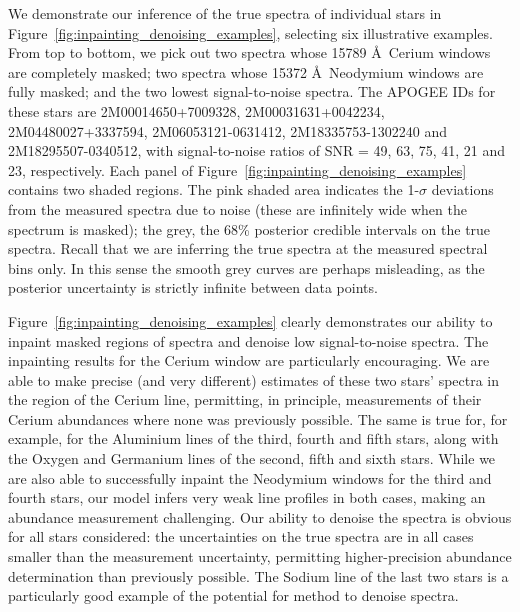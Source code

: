\documentclass[a4paper,fleqn,usenatbib]{mnras}
\begin{document}
We demonstrate our inference of the true spectra of individual stars in Figure~\ref{fig:inpainting_denoising_examples}, selecting six illustrative examples. From top to bottom, we pick out two spectra whose 15789 \AA\ Cerium windows are completely masked; two spectra whose 15372 \AA\ Neodymium windows are fully masked; and the two lowest signal-to-noise spectra. The APOGEE IDs for these stars are 2M00014650+7009328, 2M00031631+0042234, 2M04480027+3337594, 2M06053121-0631412, 2M18335753-1302240 and 2M18295507-0340512, with signal-to-noise ratios of SNR = 49, 63, 75, 41, 21 and 23, respectively. Each panel of Figure~\ref{fig:inpainting_denoising_examples} contains two shaded regions. The pink shaded area indicates the 1-$\sigma$ deviations from the measured spectra due to noise (these are infinitely wide when the spectrum is masked); the grey, the 68\% posterior credible intervals on the true spectra. Recall that we are inferring the true spectra at the measured spectral bins only. In this sense the smooth grey curves are perhaps misleading, as the posterior uncertainty is strictly infinite between data points.

Figure~\ref{fig:inpainting_denoising_examples} clearly demonstrates our ability to inpaint masked regions of spectra and denoise low signal-to-noise spectra. The inpainting results for the Cerium window are particularly encouraging. We are able to make precise (and very different) estimates of these two stars' spectra in the region of the Cerium line, permitting, in principle, measurements of their Cerium abundances where none was previously possible. The same is true for, for example, for the Aluminium lines of the third, fourth and fifth stars, along with the Oxygen and Germanium lines of the second, fifth and sixth stars. While we are also able to successfully inpaint the Neodymium windows for the third and fourth stars, our model infers very weak line profiles in both cases, making an abundance measurement challenging. Our ability to denoise the spectra is obvious for all stars considered: the uncertainties on the true spectra are in all cases smaller than the measurement uncertainty, permitting higher-precision abundance determination than previously possible. The Sodium line of the last two stars is a particularly good example of the potential for method to denoise spectra.
\end{document}

